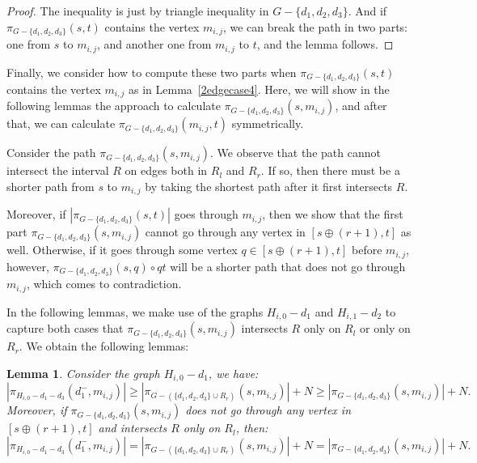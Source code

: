 \documentclass[11pt]{article}
\theoremstyle{plain}
\newtheorem{lemma}[theorem]{Lemma}
\theoremstyle{definition}
\newcommand{\set}[1]{\{ #1 \}}
\newcommand{\og}[3]{\pi_{G-#3}\left(#1,#2\right)}
\begin{document}
\begin{proof}
    The inequality is just by triangle inequality in $G-\set{d_1, d_2, d_3}$. And if $\og{s}{t}{\set{d_1, d_2, d_3}}$ contains the vertex $m_{i,j}$, we can break the path in two parts: one from $s$ to $m_{i,j}$, and another one from $m_{i,j}$ to $t$, and the lemma follows.
\end{proof}

Finally, we consider how to compute these two parts when $\og{s}{t}{\set{d_1, d_2, d_3}}$ contains the vertex $m_{i,j}$ as in Lemma~\ref{2edgecase4}. Here, we will show in the following lemmas the approach to calculate $\og{s}{m_{i,j}}{\set{d_1, d_2, d_3}}$, and after that, we can calculate $\og{m_{i,j}}{t}{\set{d_1, d_2, d_3}}$ symmetrically.

Consider the path $\og{s}{m_{i,j}}{\set{d_1, d_2, d_3}}$. We observe that the path cannot intersect the interval $R$ on edges both in $R_l$ and $R_r$. If so, then there must be a shorter path from $s$ to $m_{i,j}$ by taking the shortest path after it first intersects $R$. 

Moreover, if $|\og{s}{t}{\set{d_1, d_2, d_3}}|$ goes through $m_{i,j}$, then we show that the first part $\og{s}{m_{i,j}}{\set{d_1, d_2, d_3}}$ cannot go through any vertex in $[s \oplus (r+1),t]$ as well. Otherwise, if it goes through some vertex $q \in [s \oplus (r+1),t]$ before $m_{i,j}$, however, $\og{s}{q}{\set{d_1, d_2, d_3}} \circ qt$ will be a shorter path that does not go through $m_{i,j}$, which comes to contradiction.

In the following lemmas, we make use of the graphs $H_{i,0}-d_1$ and $H_{i,1}-d_2$ to capture both cases that $\og{s}{m_{i,j}}{\set{d_1, d_2, d_3}}$ intersects $R$ only on $R_l$ or only on $R_r$. We obtain the following lemmas:

\begin{lemma}\label{lemma:smcase1}
    Consider the graph $H_{i,0}-d_1$, we have:
    \[|\pi_{H_{i,0}-d_1-d_3}(d_1^-,m_{i,j})| \geq |\og{s}{m_{i,j}}{(\set{d_1, d_2, d_3} \cup R_r)}| + N \geq |\og{s}{m_{i,j}}{\set{d_1, d_2, d_3}}| + N.\]
    Moreover, if $\og{s}{m_{i,j}}{\set{d_1, d_2, d_3}}$ does not go through any vertex in $[s \oplus (r+1),t]$ and intersects $R$ only on $R_l$, then:
    \[|\pi_{H_{i,0}-d_1-d_3}(d_1^-,m_{i,j})| = |\og{s}{m_{i,j}}{(\set{d_1, d_2, d_3} \cup R_r)}| + N = |\og{s}{m_{i,j}}{\set{d_1, d_2, d_3}}| + N.\]
\end{lemma}
\end{document}
